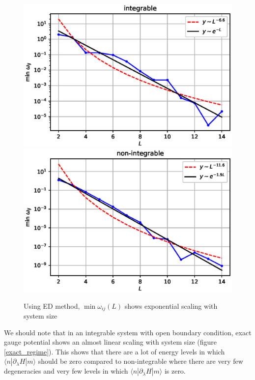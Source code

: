 \documentclass[11pt,a4paper]{article}
\begin{document}
 
\begin{figure}[!ht]
\begin{center}
\includegraphics[scale=0.535]{new_pics/v2_minwij_int.eps}
\includegraphics[scale=0.535]{new_pics/v2_minwij_nonint.eps}
\caption{Using ED method,  $\min \omega_{ij}(L)$ shows exponential scaling with system size}
\label{min_wij}
\end{center}
\end{figure} 

We should note that in an integrable system with open boundary condition, exact gauge potential shows an almost linear scaling with system size (figure \ref{exact_regime}). This shows that there are a lot of energy levels in which $ \langle n |\partial_{\lambda}H| m \rangle$ should be zero compared to non-integrable where there are very few degeneracies and very few levels in which $ \langle n |\partial_{\lambda}H| m \rangle$ is zero.
 
\end{document}

